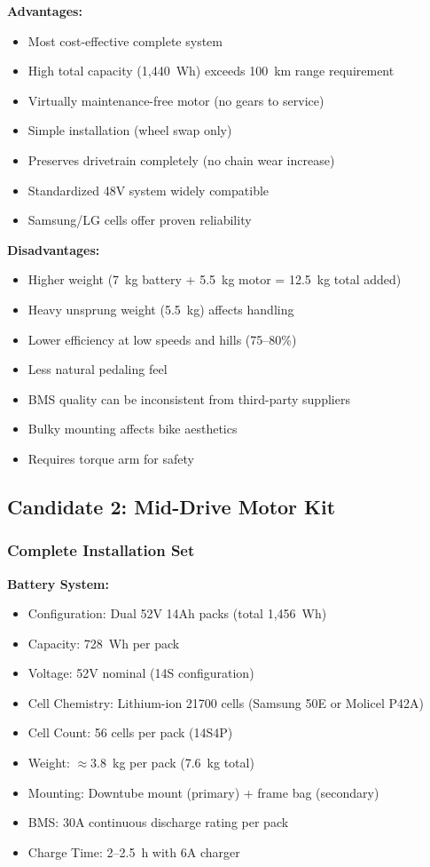 \documentclass[12pt,a4paper]{article}
\begin{document}
\textbf{Advantages:}
\begin{itemize}
    \item Most cost-effective complete system
    \item High total capacity (1,440~Wh) exceeds 100~km range requirement
    \item Virtually maintenance-free motor (no gears to service)
    \item Simple installation (wheel swap only)
    \item Preserves drivetrain completely (no chain wear increase)
    \item Standardized 48V system widely compatible
    \item Samsung/LG cells offer proven reliability
\end{itemize}

\textbf{Disadvantages:}
\begin{itemize}
    \item Higher weight (7~kg battery + 5.5~kg motor = 12.5~kg total added)
    \item Heavy unsprung weight (5.5~kg) affects handling
    \item Lower efficiency at low speeds and hills (75--80\%)
    \item Less natural pedaling feel
    \item BMS quality can be inconsistent from third-party suppliers
    \item Bulky mounting affects bike aesthetics
    \item Requires torque arm for safety
\end{itemize}

\subsection{Candidate 2: Mid-Drive Motor Kit}

\subsubsection{Complete Installation Set}

\textbf{Battery System:}
\begin{itemize}
    \item Configuration: Dual 52V 14Ah packs (total 1,456~Wh)
    \item Capacity: 728~Wh per pack
    \item Voltage: 52V nominal (14S configuration)
    \item Cell Chemistry: Lithium-ion 21700 cells (Samsung 50E or Molicel P42A) \cite{samsung-50e, molicel-p42a}
    \item Cell Count: 56 cells per pack (14S4P)
    \item Weight: $\approx$3.8~kg per pack (7.6~kg total)
    \item Mounting: Downtube mount (primary) + frame bag (secondary)
    \item BMS: 30A continuous discharge rating per pack
    \item Charge Time: 2--2.5~h with 6A charger
\end{itemize}
\end{document}

